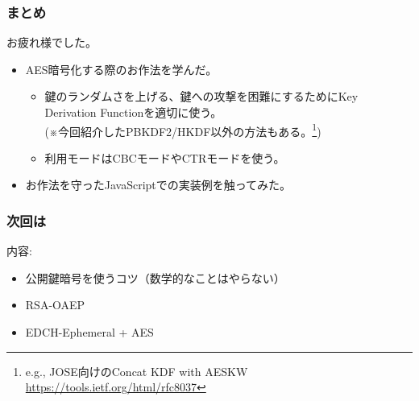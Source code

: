\documentclass[12pt,dvipdfmx]{beamer}
\newcommand{\backupbegin}{
   \newcounter{framenumberappendix}
   \setcounter{framenumberappendix}{\value{framenumber}}
}
\newcommand{\backupend}{
   \addtocounter{framenumberappendix}{-\value{framenumber}}
   \addtocounter{framenumber}{\value{framenumberappendix}} 
}
\begin{document}
\begin{frame}
\frametitle{まとめ}
お疲れ様でした。

\begin{itemize}
\item AES暗号化する際のお作法を学んだ。
\begin{itemize}
 \item 鍵のランダムさを上げる、鍵への攻撃を困難にするためにKey Derivation Functionを適切に使う。\\
(※今回紹介したPBKDF2/HKDF以外の方法もある。\footnote[frame]{\scriptsize e.g., JOSE向けのConcat KDF with AESKW \url{https://tools.ietf.org/html/rfc8037}})
 \item 利用モードはCBCモードやCTRモードを使う。
\end{itemize}
\item お作法を守ったJavaScriptでの実装例を触ってみた。
\end{itemize}
\end{frame}

\begin{frame}
\frametitle{次回は}
内容: 
\begin{itemize}
 \item 公開鍵暗号を使うコツ（数学的なことはやらない）
 \item RSA-OAEP
 \item EDCH-Ephemeral + AES
\end{itemize}
\end{frame}









 


\end{document}

